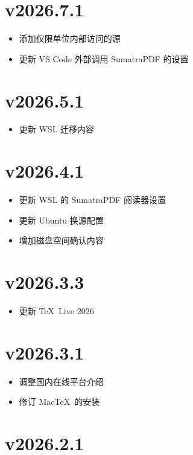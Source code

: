 \section*{v2026.7.1}

\begin{itemize}
  \item 添加仅限单位内部访问的源
  \item 更新 VS Code 外部调用 SumatraPDF 的设置
\end{itemize}

\section*{v2026.5.1}

\begin{itemize}
  \item 更新 WSL 迁移内容
\end{itemize}

\section*{v2026.4.1}

\begin{itemize}
  \item 更新 WSL 的 SumatraPDF 阅读器设置
  \item 更新 Ubuntu 换源配置
  \item 增加磁盘空间确认内容
\end{itemize}

\section*{v2026.3.3}

\begin{itemize}
  \item 更新 \TeX~Live 2026
\end{itemize}

\section*{v2026.3.1}

\begin{itemize}
  \item 调整国内在线平台介绍
  \item 修订 Mac\TeX\ 的安装
\end{itemize}

\section*{v2026.2.1}

